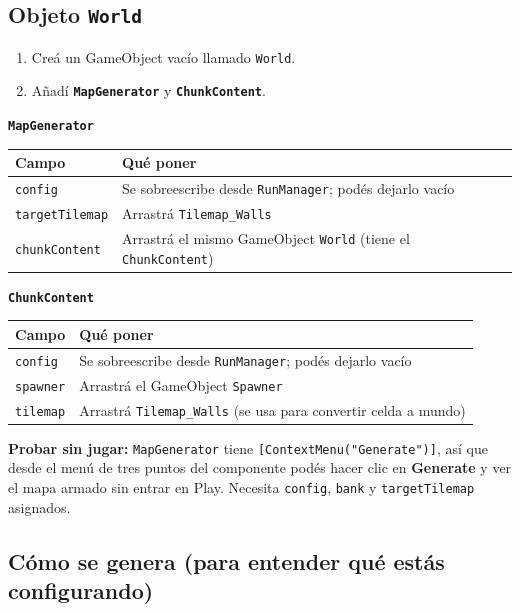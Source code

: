 \documentclass[a4paper,12pt]{article}
\newcommand{\code}[1]{\texttt{#1}}
\begin{document}
\subsection{Objeto \code{World}}

\begin{enumerate}
    \item Creá un GameObject vacío llamado \code{World}.
    \item Añadí \textbf{\code{MapGenerator}} y \textbf{\code{ChunkContent}}.
\end{enumerate}

\textbf{\code{MapGenerator}}

\begin{center}
\begin{tabular}{|l|p{8.4cm}|}
\hline
\textbf{Campo} & \textbf{Qué poner} \\
\hline
\code{config} & Se sobreescribe desde \code{RunManager}; podés dejarlo vacío \\
\hline
\code{targetTilemap} & Arrastrá \code{Tilemap\_Walls} \\
\hline
\code{chunkContent} & Arrastrá el mismo GameObject \code{World} (tiene el \code{ChunkContent}) \\
\hline
\end{tabular}
\end{center}

\textbf{\code{ChunkContent}}

\begin{center}
\begin{tabular}{|l|p{8.4cm}|}
\hline
\textbf{Campo} & \textbf{Qué poner} \\
\hline
\code{config} & Se sobreescribe desde \code{RunManager}; podés dejarlo vacío \\
\hline
\code{spawner} & Arrastrá el GameObject \code{Spawner} \\
\hline
\code{tilemap} & Arrastrá \code{Tilemap\_Walls} (se usa para convertir celda a mundo) \\
\hline
\end{tabular}
\end{center}

\textbf{Probar sin jugar:} \code{MapGenerator} tiene \code{[ContextMenu("Generate")]}, así que
desde el menú de tres puntos del componente podés hacer clic en \textbf{Generate} y ver el mapa
armado sin entrar en Play. Necesita \code{config}, \code{bank} y \code{targetTilemap} asignados.

\subsection{Cómo se genera (para entender qué estás configurando)}
\end{document}
